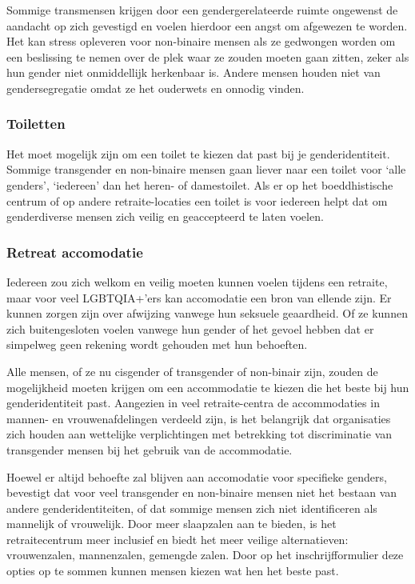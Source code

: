 \documentclass[12pt,openany]{book}
\begin{document}
Sommige transmensen krijgen door een gendergerelateerde ruimte ongewenst de aandacht op zich gevestigd en voelen hierdoor een angst om afgewezen te worden. Het kan stress opleveren voor non-binaire mensen als ze gedwongen worden om een beslissing te nemen over de plek waar ze zouden moeten gaan zitten, zeker als hun gender niet onmiddellijk herkenbaar is. Andere mensen houden niet van gendersegregatie omdat ze het ouderwets en onnodig vinden.

\subsubsection*{Toiletten}

Het moet mogelijk zijn om een toilet te kiezen dat past bij je genderidentiteit. Sommige transgender en non-binaire mensen gaan liever naar een toilet voor ‘alle genders’, ‘iedereen’ dan het heren- of damestoilet. Als er op het boeddhistische centrum of op andere retraite-locaties een toilet is voor iedereen helpt dat om genderdiverse mensen zich veilig en geaccepteerd te laten voelen.

\subsubsection*{Retreat accomodatie}

Iedereen zou zich welkom en veilig moeten kunnen voelen tijdens een retraite, maar voor veel LGBTQIA+’ers kan accomodatie een bron van ellende zijn. Er kunnen zorgen zijn over afwijzing vanwege hun seksuele geaardheid. Of ze kunnen zich buitengesloten voelen vanwege hun gender of het gevoel hebben dat er simpelweg geen rekening wordt gehouden met hun behoeften. 

Alle mensen, of ze nu cisgender of transgender of non-binair zijn, zouden de mogelijkheid moeten krijgen om een accommodatie te kiezen die het beste bij hun genderidentiteit past. Aangezien in veel retraite-centra de accommodaties in mannen- en vrouwenafdelingen verdeeld zijn, is het belangrijk dat organisaties zich houden aan wettelijke verplichtingen met betrekking tot discriminatie van transgender mensen bij het gebruik van de accommodatie.

Hoewel er altijd behoefte zal blijven aan accomodatie voor specifieke genders, bevestigt dat voor veel transgender en non-binaire mensen niet het bestaan van andere genderidentiteiten, of dat sommige mensen zich niet identificeren als mannelijk of vrouwelijk. Door meer slaapzalen aan te bieden, is het retraitecentrum meer inclusief en biedt het meer veilige alternatieven: vrouwenzalen, mannenzalen, gemengde zalen. Door op het inschrijfformulier deze opties op te sommen kunnen mensen kiezen wat hen het beste past.
\end{document}
